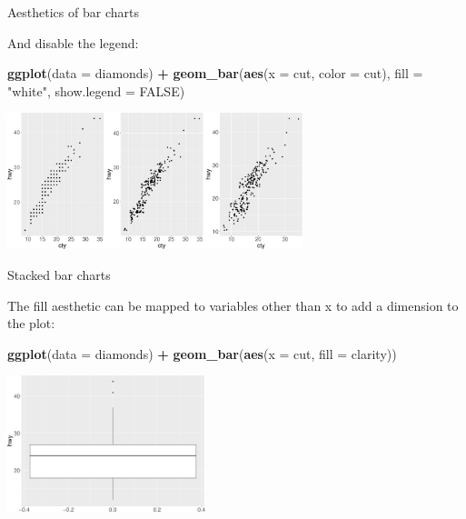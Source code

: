 \documentclass[ignorenonframetext,]{beamer}
\newenvironment{Shaded}{\begin{snugshade}}{\end{snugshade}}
\newcommand{\DataTypeTok}[1]{\textcolor[rgb]{0.13,0.29,0.53}{#1}}
\newcommand{\KeywordTok}[1]{\textcolor[rgb]{0.13,0.29,0.53}{\textbf{#1}}}
\newcommand{\NormalTok}[1]{#1}
\newcommand{\OperatorTok}[1]{\textcolor[rgb]{0.81,0.36,0.00}{\textbf{#1}}}
\newcommand{\OtherTok}[1]{\textcolor[rgb]{0.56,0.35,0.01}{#1}}
\newcommand{\StringTok}[1]{\textcolor[rgb]{0.31,0.60,0.02}{#1}}
\begin{document}
\begin{frame}[fragile]{Aesthetics of bar charts}
\protect\hypertarget{aesthetics-of-bar-charts-3}{}

And disable the legend:

\begin{Shaded}
\begin{Highlighting}[]
\KeywordTok{ggplot}\NormalTok{(}\DataTypeTok{data =}\NormalTok{ diamonds) }\OperatorTok{+}\StringTok{ }
\StringTok{  }\KeywordTok{geom_bar}\NormalTok{(}\KeywordTok{aes}\NormalTok{(}\DataTypeTok{x =}\NormalTok{ cut, }\DataTypeTok{color =}\NormalTok{ cut),}
           \DataTypeTok{fill =} \StringTok{"white"}\NormalTok{, }\DataTypeTok{show.legend =} \OtherTok{FALSE}\NormalTok{)}
\end{Highlighting}
\end{Shaded}

\begin{center}\includegraphics[height=150px]{data-visualization_files/figure-beamer/unnamed-chunk-135-1} \end{center}

\end{frame}

\begin{frame}[fragile]{Stacked bar charts}
\protect\hypertarget{stacked-bar-charts}{}

The fill aesthetic can be mapped to variables other than x to add a
dimension to the plot:

\begin{Shaded}
\begin{Highlighting}[]
\KeywordTok{ggplot}\NormalTok{(}\DataTypeTok{data =}\NormalTok{ diamonds) }\OperatorTok{+}\StringTok{ }
\StringTok{  }\KeywordTok{geom_bar}\NormalTok{(}\KeywordTok{aes}\NormalTok{(}\DataTypeTok{x =}\NormalTok{ cut, }\DataTypeTok{fill =}\NormalTok{ clarity))}
\end{Highlighting}
\end{Shaded}

\begin{center}\includegraphics[height=150px]{data-visualization_files/figure-beamer/unnamed-chunk-136-1} \end{center}

\end{frame}
\end{document}
